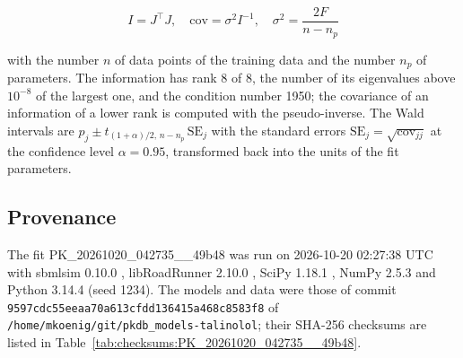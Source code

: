 \begin{equation}
I = J^\top J, \quad \mathrm{cov} = \sigma^2 I^{-1}, \quad \sigma^2 = \frac{2 F}{n - n_p}
\end{equation}

with the number $n$ of data points of the training data and the number $n_p$ of parameters. The information has rank 8 of 8, the number of its eigenvalues above $10^{-8}$ of the largest one, and the condition number 1950; the covariance of an information of a lower rank is computed with the pseudo-inverse. The Wald intervals are $\hat{p}_j \pm t_{(1+\alpha)/2,\, n-n_p}\, \mathrm{SE}_j$ with the standard errors $\mathrm{SE}_j = \sqrt{\mathrm{cov}_{jj}}$ at the confidence level $\alpha = 0.95$, transformed back into the units of the fit parameters.

\subsection{Provenance}

The fit PK\_20261020\_042735\_\_49b48 was run on 2026-10-20 02:27:38 UTC with sbmlsim 0.10.0 \cite{Koenig2026_sbmlsim}, libRoadRunner 2.10.0 \cite{Welsh2023}, SciPy 1.18.1 \cite{Virtanen2020}, NumPy 2.5.3 \cite{Harris2020} and Python 3.14.4 (seed 1234). The models and data were those of commit \texttt{9597cdc55eeaa70a613cfdd136415a468c8583f8} of \texttt{/home/mkoenig/git/pkdb\_models-talinolol}; their SHA-256 checksums are listed in Table~\ref{tab:checksums:PK_20261020_042735__49b48}.

